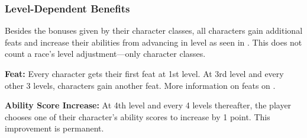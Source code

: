 
\subsubsection{Level-Dependent Benefits}
Besides the bonuses given by their character classes, all characters gain additional feats and increase their abilities from advancing in level as seen in . This does not count a race's level adjustment---only character classes.

\textbf{Feat:} Every character gets their first feat at 1st level. At 3rd level and every other 3 levels, characters gain another feat. More information on feats on .

\textbf{Ability Score Increase:} At 4th level and every 4 levels thereafter, the player chooses one of their character's ability scores to increase by 1 point. This improvement is permanent.


